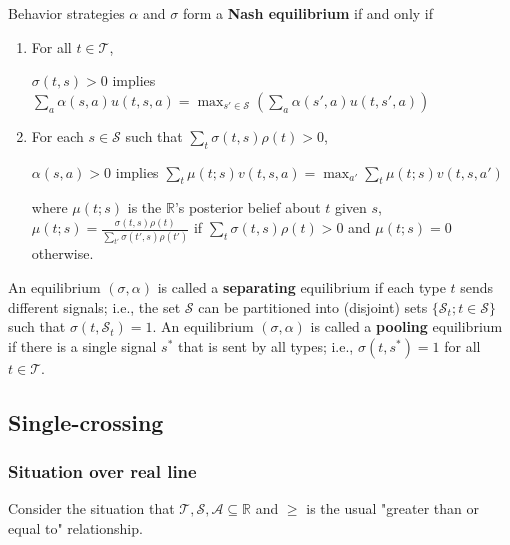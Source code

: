 \documentclass[11pt]{elegantbook_2}
\begin{document}
\begin{definition}
    Behavior strategies $\alpha$ and $\sigma$ form a \textbf{Nash equilibrium} if and only if
    \begin{enumerate}
        \item For all $t\in \mathcal{T}$,
        \begin{center}
            $\sigma(t,s)>0$ implies $\sum_a \alpha(s,a)u(t,s,a) = \max_{s'\in \mathcal{S}}\left(\sum_a \alpha(s',a)u(t,s',a)\right)$
        \end{center}
        \item For each $s\in \mathcal{S}$ such that $\sum_{t}\sigma(t,s)\rho(t)>0$,
        \begin{center}
            $\alpha(s,a)>0$ implies $\sum_{t}\mu(t;s)v(t,s,a) = \max_{a'}\sum_{t}\mu(t;s)v(t,s,a')$
        \end{center}
        where $\mu(t;s)$ is the $\mathbb{R}$'s posterior belief about $t$ given $s$, $\mu(t;s)=\frac{\sigma(t,s)\rho(t)}{\sum_{t'}\sigma(t',s)\rho(t')}$ if $\sum_t\sigma(t,s)\rho(t)>0$ and $\mu(t;s)=0$ otherwise.
    \end{enumerate}
\end{definition}

\begin{definition}
    An equilibrium $(\sigma,\alpha)$ is called a \textbf{separating} equilibrium if each type $t$ sends different signals; i.e., the set $\mathcal{S}$ can be partitioned into (disjoint) sets $\{\mathcal{S}_t; t\in \mathcal{S}\}$ such that $\sigma(t, \mathcal{S}_t) = 1$. An equilibrium $(\sigma,\alpha)$ is called a \textbf{pooling} equilibrium if there is a single signal $s^*$ that is sent by all types; i.e., $\sigma(t, s^*) = 1$ for all $t\in \mathcal{T}$.
\end{definition}


\subsection{Single-crossing}

\subsubsection{Situation over real line}
Consider the situation that $\mathcal{T},\mathcal{S},\mathcal{A}\subseteq \mathbb{R}$ and $\geq$ is the usual "greater than or equal to" relationship.
\end{document}
